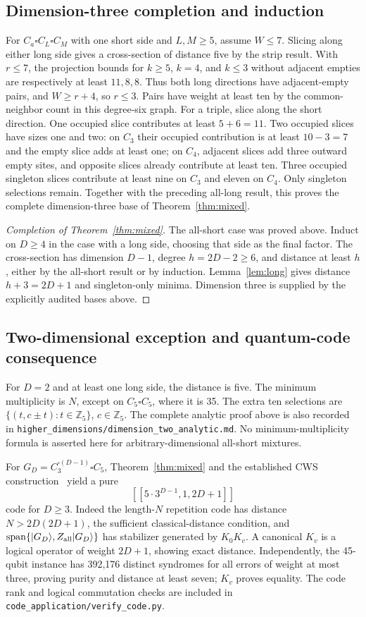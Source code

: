 \subsection*{Dimension-three completion and induction}
For $C_a\square C_L\square C_M$ with one short side and $L,M\ge5$, assume $W\le7$. Slicing along either long side gives a cross-section of distance five by the strip result. With $r\le7$, the projection bounds for $k\ge5$, $k=4$, and $k\le3$ without adjacent empties are respectively at least $11,8,8$. Thus both long directions have adjacent-empty pairs, and $W\ge r+4$, so $r\le3$. Pairs have weight at least ten by the common-neighbor count in this degree-six graph. For a triple, slice along the short direction. One occupied slice contributes at least $5+6=11$. Two occupied slices have sizes one and two: on $C_3$ their occupied contribution is at least $10-3=7$ and the empty slice adds at least one; on $C_4$, adjacent slices add three outward empty sites, and opposite slices already contribute at least ten. Three occupied singleton slices contribute at least nine on $C_3$ and eleven on $C_4$. Only singleton selections remain. Together with the preceding all-long result, this proves the complete dimension-three base of Theorem~\ref{thm:mixed}.

\begin{proof}[Completion of Theorem~\ref{thm:mixed}]
The all-short case was proved above. Induct on $D\ge4$ in the case with a long side, choosing that side as the final factor. The cross-section has dimension $D-1$, degree $h=2D-2\ge6$, and distance at least $h$, either by the all-short result or by induction. Lemma~\ref{lem:long} gives distance $h+3=2D+1$ and singleton-only minima. Dimension three is supplied by the explicitly audited bases above.
\end{proof}

\subsection*{Two-dimensional exception and quantum-code consequence}
For $D=2$ and at least one long side, the distance is five. The minimum multiplicity is $N$, except on $C_5\square C_5$, where it is 35. The extra ten selections are $\{(t,c\pm t):t\in\mathbb Z_5\}$, $c\in\mathbb Z_5$. The complete analytic proof above is also recorded in \texttt{higher\_dimensions/dimension\_two\_analytic.md}. No minimum-multiplicity formula is asserted here for arbitrary-dimensional all-short mixtures.

For $G_D=C_3^{\square(D-1)}\square C_5$, Theorem~\ref{thm:mixed} and the established CWS construction~\cite{sudevan2025} yield a pure
\[
 [[5\cdot3^{D-1},1,2D+1]]
\]
code for $D\ge3$. Indeed the length-$N$ repetition code has distance $N>2D(2D+1)$, the sufficient classical-distance condition, and $\operatorname{span}\{|G_D\rangle,Z_{\rm all}|G_D\rangle\}$ has stabilizer generated by $K_0K_v$. A canonical $K_v$ is a logical operator of weight $2D+1$, showing exact distance. Independently, the 45-qubit instance has 392,176 distinct syndromes for all errors of weight at most three, proving purity and distance at least seven; $K_v$ proves equality. The code rank and logical commutation checks are included in \texttt{code\_application/verify\_code.py}.

